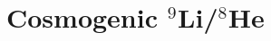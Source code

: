 \documentclass[../thesis.tex]{subfiles}
\begin{document}
\begin{comment}
As previously stated, the accidental background can be straightforwardly measured based on the characteristics of singles events. The singles spectrum is first measured by searching for prompt-like events that satisfy the usual muon vetoes but are separated from other prompt-like events by at least 400~$\mu$s. The total integral of this spectrum gives the prompt-like rate $R_p$, while the integral above 6~MeV gives the delayed-like rate $R_d$. The accidental background rate is then simply
\[ R_\mathrm{acc} = R_d(1 - e^{-R_p\Delta t})e^{-2R_p\Delta t}, \] where the factor in parentheses is the probability for a prompt-like single to fall within the $\Delta t$~=~200~$\mu$s preceding a delayed-like single, and the final factor is the probability that the event is \emph{not} rejected by the decoupled multiplicity cut, which disallows any additional prompt-like single in the 400~$\mu$s preceding the delayed event. Once the rate has been determined this way, the spectrum is trivial: It is simply the singles spectrum itself.
\end{comment}

\begin{comment}
  Mention IHEP's cross-check, and the additional uncertainty stemming from the difference between it and the nominal result?
\end{comment}

\section{Cosmogenic $^9$Li/$^8$He}
\label{sec:bkgCosmo}

\newcommand\linine{$^9$Li}
\end{document}
